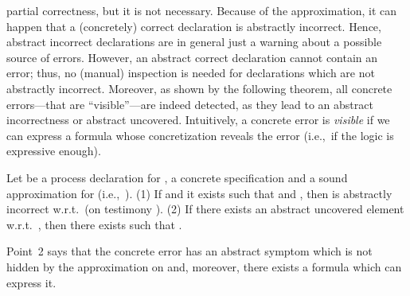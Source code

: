 \documentclass[american]{new_tlp}
\providecommand*{\ie}   {i.e.,}
\providecommand*{\wrt}  {w.r.t.}
\begin{document}
partial correctness, but it is not necessary.  Because of the
approximation, it can happen that a (concretely) correct declaration is
abstractly incorrect.  Hence, abstract incorrect declarations are in
general just a warning about a possible source of errors.  However, an
abstract correct declaration cannot contain an error; thus, no (manual)
inspection is needed for declarations which are not abstractly incorrect.
Moreover, as shown by the following theorem, all concrete errors---that are
``visible''---are indeed detected, as they lead to an abstract
incorrectness or abstract uncovered.  Intuitively, a concrete error is
\emph{visible} if we can express a formula  whose concretization
reveals the error (\ie\ if the logic is expressive enough).
\begin{theorem}
    \label{th:abs-conc}
    
    Let  be a process declaration for ,  a concrete
    specification and  a sound approximation for  (\ie\ ).
    (1) If  and it exists 
    such that 
    and , then  is
    abstractly incorrect \wrt\  (on testimony ).
    (2) If there exists an abstract uncovered element  \wrt\
    , then there exists  such that .
\end{theorem}
Point~2 says that the concrete error has an abstract symptom which is not
hidden by the approximation on  and, moreover, there exists a formula
 which can express it.
\end{document}
